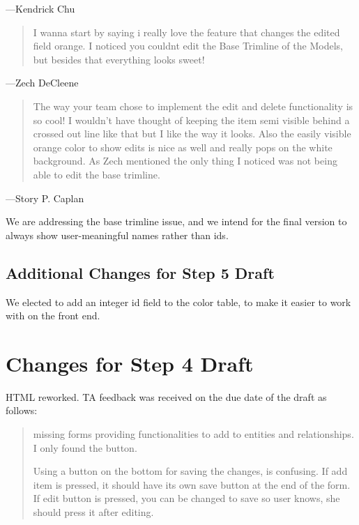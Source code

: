 \documentclass[11pt,letterpaper,oneside]{amsart}
\begin{document}
---Kendrick Chu

\begin{quotation}
I wanna start by saying i really love the feature that changes the edited field orange. I noticed you couldnt edit the Base Trimline of the Models, but besides that everything looks sweet!
\end{quotation}

---Zech DeCleene

\begin{quotation}
The way your team chose to implement the edit and delete functionality is so cool! I wouldn't have thought of keeping the item semi visible behind a crossed out line like that but I like the way it looks. Also the easily visible orange color to show edits is nice as well and really pops on the white background. As Zech mentioned the only thing I noticed was not being able to edit the base trimline.
\end{quotation}

---Story P. Caplan

We are addressing the base trimline issue, and we intend for the final version to always show user-meaningful names rather than ids.

\subsection*{Additional Changes for Step 5 Draft}

We elected to add an integer id field to the color table, to make it easier to work with on the front end.


\section*{Changes for Step 4 Draft}

HTML reworked.  TA feedback was received on the due date of the draft as follows:

\begin{quotation}
missing forms providing functionalities to add to entities and relationships. I only found the button.

Using a button on the bottom for saving the changes, is confusing.  If add item is pressed, it should have its own save button at the end of the form. If edit button is pressed, you can be changed to save so user knows, she should press it after editing.

\end{quotation}
\end{document}
